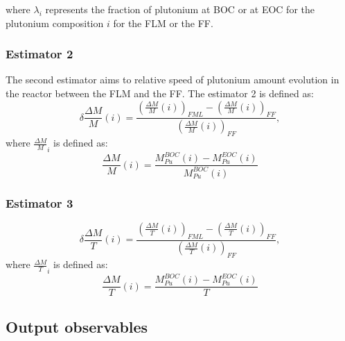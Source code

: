 where $\lambda_i$ represents the fraction of plutonium at \gls{BOC} or at
\gls{EOC} for the plutonium composition $i$ for the \gls{FLM} or the \gls{FF}.

\subsubsection{Estimator 2}
The second estimator aims to relative speed of plutonium amount evolution in the
reactor between the \gls{FLM} and the \gls{FF}. The estimator 2 is defined as:
\begin{equation}
    \delta{\frac{\Delta M}{M}}(i) =
        \frac{\left(\frac{\Delta M}{M}(i)\right)_{FML}
              - \left(\frac{\Delta M}{M}(i)\right)_{FF}}
             {\left(\frac{\Delta M}{M}(i)\right)_{FF}},
\end{equation}
where $\frac{\Delta M}{M}_{i}$ is defined as:
\begin{equation}
    \frac{\Delta M}{M}(i) = \frac{M_{Pu}^{BOC}(i) -
    M_{Pu}^{EOC}(i)}{M_{Pu}^{BOC}(i)}
\end{equation}


\subsubsection{Estimator 3}


\begin{equation}
    \delta{\frac{\Delta M}{T}}(i) =
        \frac{\left(\frac{\Delta M}{T}(i)\right)_{FML}
              - \left(\frac{\Delta M}{T}(i)\right)_{FF}}
             {\left(\frac{\Delta M}{T}(i)\right)_{FF}},
\end{equation}
where $\frac{\Delta M}{T}_{i}$ is defined as:
\begin{equation}
    \frac{\Delta M}{T}(i) = \frac{M_{Pu}^{BOC}(i) -
    M_{Pu}^{EOC}(i)}{T}
\end{equation}

\subsection{Output observables}


